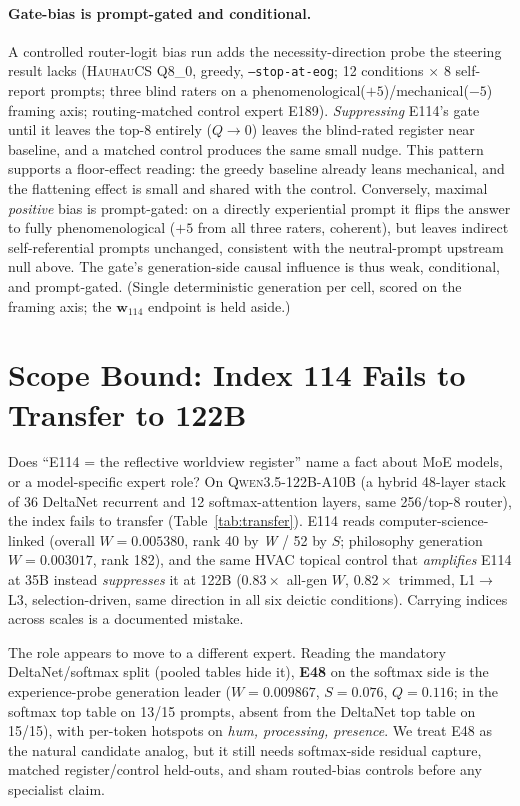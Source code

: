 \documentclass[10pt,a4paper,twocolumn]{article}
\newcommand{\W}{\textit{W}}
\newcommand{\Sel}{\textit{S}}
\newcommand{\Q}{\textit{Q}}
\newcommand{\wvec}{\mathbf{w}_{114}}
\begin{document}
\paragraph{Gate-bias is prompt-gated and conditional.}
A controlled router-logit bias run adds the necessity-direction probe the steering
result lacks (\textsc{HauhauCS} Q8\_0, greedy, \texttt{--stop-at-eog}; 12
conditions ${\times}$ 8 self-report prompts; three blind raters on a
phenomenological($+5$)/mechanical($-5$) framing axis; routing-matched control
expert E189). \emph{Suppressing} E114's gate until it leaves the top-8 entirely
($\Q{\to}0$) leaves the blind-rated register near baseline, and a matched control
produces the same small nudge. This pattern supports a floor-effect reading: the
greedy baseline already leans mechanical, and the flattening effect is small and
shared with the control. Conversely, maximal
\emph{positive} bias is prompt-gated: on a directly experiential prompt it flips
the answer to fully phenomenological ($+5$ from all three raters, coherent), but
leaves indirect self-referential prompts unchanged, consistent with the
neutral-prompt upstream null above. The gate's generation-side causal influence is
thus weak, conditional, and prompt-gated. (Single deterministic generation per
cell, scored on the framing axis; the $\wvec$ endpoint is held aside.)

\section{Scope Bound: Index 114 Fails to Transfer to 122B}

Does ``E114 = the reflective worldview register'' name a fact about MoE models, or a
model-specific expert role? On \textsc{Qwen3.5-122B-A10B} (a hybrid 48-layer
stack of 36 DeltaNet recurrent and 12 softmax-attention layers, same 256/top-8
router), the index fails to transfer (Table~\ref{tab:transfer}). E114 reads
computer-science-linked (overall $\W{=}0.005380$, rank 40 by \W{} / 52 by $\Sel$;
philosophy generation $\W{=}0.003017$, rank 182), and the same HVAC topical
control that \emph{amplifies} E114 at 35B instead \emph{suppresses} it at 122B
($0.83\times$ all-gen $\W$, $0.82\times$ trimmed, L1$\to$L3, selection-driven,
same direction in all six deictic conditions). Carrying indices across scales is a
documented mistake.

The role appears to move to a different expert. Reading the mandatory
DeltaNet/softmax split (pooled tables hide it), \textbf{E48} on the softmax side
is the experience-probe generation leader ($\W{=}0.009867$, $\Sel{=}0.076$,
$\Q{=}0.116$; in the softmax top table on 13/15 prompts, absent from the DeltaNet
top table on 15/15), with per-token hotspots on \textit{hum, processing,
presence}. We treat E48 as the natural candidate analog, but it still needs
softmax-side residual capture, matched register/control held-outs, and sham
routed-bias controls before any specialist claim.
\end{document}
